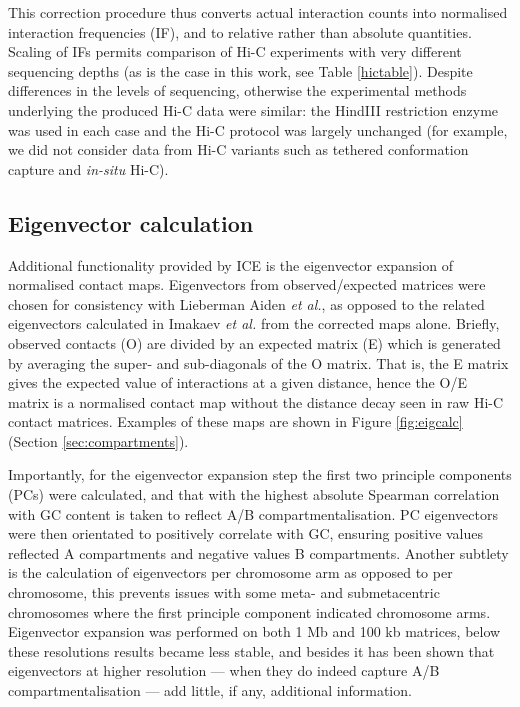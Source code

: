 \documentclass[a4paper,11pt,oneside]{book}
\begin{document}
This correction procedure thus converts actual interaction counts into normalised interaction frequencies (IF), and to relative rather than absolute quantities. Scaling of IFs permits comparison of Hi-C experiments with very different sequencing depths (as is the case in this work, see Table \ref{hictable}). Despite differences in the levels of sequencing, otherwise the experimental methods underlying the produced Hi-C data were similar: the HindIII restriction enzyme was used in each case and the Hi-C protocol was largely unchanged (for example, we did not consider data from Hi-C variants such as tethered conformation capture\cite{Kalhor2012} and \emph{in-situ} Hi-C\cite{Rao2014}).

\subsection{Eigenvector calculation}\label{sec:eigs}
Additional functionality provided by ICE is the eigenvector expansion of normalised contact maps. Eigenvectors from observed/expected matrices were chosen for consistency with Lieberman Aiden \emph{et al.},\cite{Lieberman2009} as opposed to the related eigenvectors calculated in Imakaev \emph{et al.}\cite{Imakaev2012} from the corrected maps alone. Briefly, observed contacts (O) are divided by an expected matrix (E) which is generated by averaging the super- and sub-diagonals of the O matrix. That is, the E matrix gives the expected value of interactions at a given distance, hence the O/E matrix is a normalised contact map without the distance decay seen in raw Hi-C contact matrices. Examples of these maps are shown in Figure \ref{fig:eigcalc} (Section \ref{sec:compartments}).

Importantly, for the eigenvector expansion step the first two principle components (PCs) were calculated, and that with the highest absolute Spearman correlation with GC content is taken to reflect A/B compartmentalisation. PC eigenvectors were then orientated to positively correlate with GC, ensuring positive values reflected A compartments and negative values B compartments. Another subtlety is the calculation of eigenvectors per chromosome arm as opposed to per chromosome, this prevents issues with some meta- and submetacentric chromosomes where the first principle component indicated chromosome arms.\cite{Lieberman2009, Imakaev2012} Eigenvector expansion was performed on both 1 Mb and 100 kb matrices, below these resolutions results became less stable, and besides it has been shown that eigenvectors at higher resolution --- when they do indeed capture A/B compartmentalisation --- add little, if any, additional information.\cite{Fortin2015a}
\end{document}

